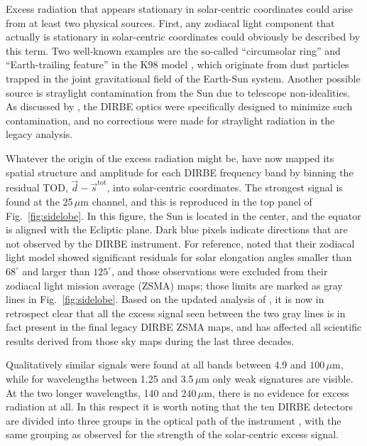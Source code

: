 \documentclass{aa}
\newcommand{\dv}[0]{\vec{d}}
\newcommand{\s}[0]{\vec{s}}
\begin{document}
Excess radiation that appears stationary in solar-centric coordinates
could arise from at least two physical sources. First, any zodiacal
light component that actually is stationary in solar-centric
coordinates could obviously be described by this term. Two well-known
examples are the so-called ``circumsolar ring'' and ``Earth-trailing
feature'' in the K98 model \citep{kelsall1998}, which originate from
dust particles trapped in the joint gravitational field of the
Earth-Sun system. Another possible source is straylight contamination
from the Sun due to telescope non-idealities. As discussed by
\citet{hauser1998}, the DIRBE optics were specifically designed to
minimize such contamination, and no corrections were made for
straylight radiation in the legacy analysis. 

Whatever the origin of the excess radiation might be, \citet{CG02_01}
have now mapped its spatial structure and amplitude for each DIRBE
frequency band by binning the residual TOD, $\dv - \s^{\mathrm{tot}}$,
into solar-centric coordinates. The strongest signal is found at the
25\,$\mu\mathrm{m}$ channel, and this is reproduced in the top panel
of Fig.~\ref{fig:sidelobe}. In this figure, the Sun is located in the
center, and the equator is aligned with the Ecliptic plane. Dark blue
pixels indicate directions that are not observed by the DIRBE
instrument. For reference, \citet{kelsall1998} noted that their
zodiacal light model showed significant residuals for solar elongation
angles smaller than $68^{\circ}$ and larger than $125^{\circ}$, and
those observations were excluded from their zodiacal light mission
average (ZSMA) maps; those limits are marked as gray lines in
Fig.~\ref{fig:sidelobe}. Based on the updated analysis of
\citet{CG02_01}, it is now in retrospect clear that all the excess
signal seen between the two gray lines is in fact present in the final
legacy DIRBE ZSMA maps, and has affected all scientific results
derived from those sky maps during the last three decades.

Qualitatively similar signals were found at all bands between 4.9 and
$100\,\mu\mathrm{m}$, while for wavelengths between 1.25 and
3.5$\,\mu\mathrm{m}$ only weak signatures are visible. At the two
longer wavelengths, 140 and $240\,\mu\mathrm{m}$, there is no evidence
for excess radiation at all. In this respect it is worth noting that
the ten DIRBE detectors are divided into three groups in the optical
path of the instrument \citep{silverberg93}, with the same
grouping as observed for the strength of the solar-centric excess
signal.
\end{document}
